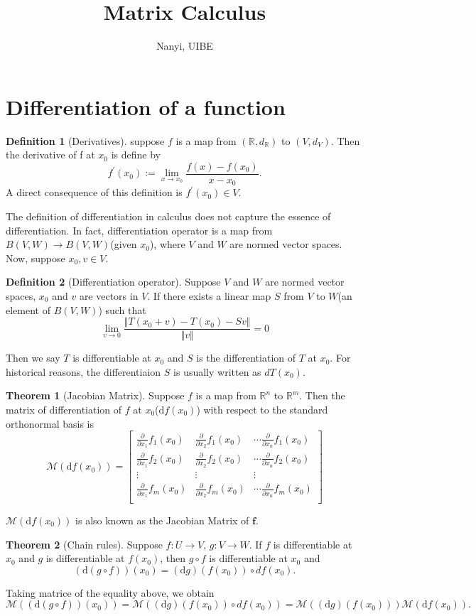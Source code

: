 \documentclass[12pt]{article}
\theoremstyle{definition}
\newtheorem{definition}{Definition}[section]
\newtheorem{theorem}{Theorem}[section]
\newcommand{\R}{\mathbb{R}}
\newcommand{\f}{\mathbf{f}}
\newcommand{\D}{\mathrm{d}}
\newcommand{\pd}[1]{\frac{\partial}{\partial #1}}
\begin{document}
\title{Matrix Calculus}
\author{Nanyi, UIBE}
\maketitle %
\section{Differentiation of a function}
\begin{definition}[Derivatives]
suppose $f$ is a map from $(\mathbb{R},d_\mathbb{R})$ to $(V,d_V)$. Then the derivative of f at $x_0$ is define by 
$$
f^{\prime}(x_0):=\lim_{x \to x_0} \frac{f(x)-f(x_0)}{x-x_0}.
$$
A direct consequence of this definition is $f^{\prime}(x_0) \in V$.
\end{definition}

The definition of differentiation in calculus does not capture the essence of differentiation. In fact, differentiation operator is a map from $B(V,W) \to B(V,W)$(given $x_0$), where $V$ and $W$ are normed vector spaces. Now, suppose $x_0, v \in V$.

\begin{definition}[Differentiation operator]
Suppose $V$ and $W$ are normed vector spaces, $x_0$ and $v$ are vectors in $V$. If there exists a linear map $S$ from $V$ to $W$(an element of $B(V,W)$) such that
$$
\lim_{v \to 0} \frac{\Vert T(x_0+v)-T(x_0)- Sv\Vert}{\Vert v\Vert}=0
$$
\end{definition} 
Then we say $T$ is differentiable at $x_0$ and $S$ is the differentiation of $T$ at $x_0$. For historical reasons, the differentiaion $S$ is usually written as $dT(x_0)$. \par

\begin{theorem}[Jacobian Matrix]
Suppose $f$ is a map from $\R^n$ to $\R^m$. Then the matrix of differentiation of $f$ at $x_0$($\D f(x_0)$) with respect to the standard orthonormal basis is
$$
\mathcal{M}(\D f(x_0)) = 
\begin{bmatrix}
	\pd{x_1}f_1(x_0) & \pd{x_2}f_1(x_0) & \cdots \pd{x_n}f_1(x_0) \\
	\pd{x_1}f_2(x_0) & \pd{x_2}f_2(x_0) & \cdots \pd{x_n}f_2(x_0) \\
	\vdots & \vdots  &\vdots \\
	\pd{x_1}f_m(x_0) & \pd{x_2}f_m(x_0) & \cdots \pd{x_n}f_m(x_0) \\
\end{bmatrix}
$$
\end{theorem}
$\mathcal{M}(\D f(x_0))$ is also known as the Jacobian Matrix of $\f$.
\begin{theorem}[Chain rules]\label{Chain rules}
Suppose $f:U \to V$, $g:V \to W$. If $f$ is differentiable at $x_0$ and $g$ is differentiable at $f(x_0)$, then $g \circ f$ is differentiable at $x_0$ and 
$$
(\D(g \circ f))(x_0) = (\D g)(f(x_0)) \circ d f(x_0). 
$$
\end{theorem}
Taking matrice of the equality above, we obtain
$$
\mathcal{M}((\D(g \circ f))(x_0))=\mathcal{M}((\D g)(f(x_0)) \circ d f(x_0))= \mathcal{M}((\D g)(f(x_0))) \mathcal{M}(\D f(x_0)).
$$
\end{document}
